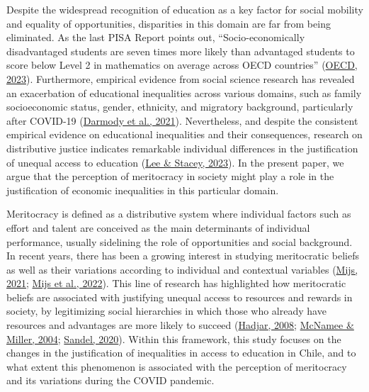 \documentclass[
  12pt,
  a4paper,
]{article}
\begin{document}
Despite the widespread recognition of education as a key factor for
social mobility and equality of opportunities, disparities in this
domain are far from being eliminated. As the last PISA Report points
out, ``Socio-economically disadvantaged students are seven times more
likely than advantaged students to score below Level 2 in mathematics on
average across OECD countries''
(\protect\hyperlink{ref-oecd_pisa_2023}{OECD, 2023}). Furthermore,
empirical evidence from social science research has revealed an
exacerbation of educational inequalities across various domains, such as
family socioeconomic status, gender, ethnicity, and migratory
background, particularly after COVID-19
(\protect\hyperlink{ref-darmodyImpactsCOVID19Control2021}{Darmody et
al., 2021}). Nevertheless, and despite the consistent empirical evidence
on educational inequalities and their consequences, research on
distributive justice indicates remarkable individual differences in the
justification of unequal access to education
(\protect\hyperlink{ref-leeFairnessPerceptionsEducational2023}{Lee \&
Stacey, 2023}). In the present paper, we argue that the perception of
meritocracy in society might play a role in the justification of
economic inequalities in this particular domain.

Meritocracy is defined as a distributive system where individual factors
such as effort and talent are conceived as the main determinants of
individual performance, usually sidelining the role of opportunities and
social background. In recent years, there has been a growing interest in
studying meritocratic beliefs as well as their variations according to
individual and contextual variables
(\protect\hyperlink{ref-mijs_paradox_2021}{Mijs, 2021};
\protect\hyperlink{ref-mijs_belief_2022}{Mijs et al., 2022}). This line
of research has highlighted how meritocratic beliefs are associated with
justifying unequal access to resources and rewards in society, by
legitimizing social hierarchies in which those who already have
resources and advantages are more likely to succeed
(\protect\hyperlink{ref-hadjar_meritokratie_2008}{Hadjar, 2008};
\protect\hyperlink{ref-mcnamee_meritocracy_2004}{McNamee \& Miller,
2004}; \protect\hyperlink{ref-sandel_tyranny_2020}{Sandel, 2020}).
Within this framework, this study focuses on the changes in the
justification of inequalities in access to education in Chile, and to
what extent this phenomenon is associated with the perception of
meritocracy and its variations during the COVID pandemic.
\end{document}
